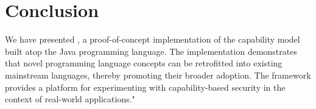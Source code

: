 \section{Conclusion}

We have presented \jdala, a proof-of-concept implementation of the \dala capability model built atop the Java programming language.
The implementation demonstrates that novel programming language concepts can be retrofitted into existing mainstream languages, thereby promoting their broader adoption. The \jdala framework provides a platform for experimenting with capability-based security in the context of real-world applications."

 